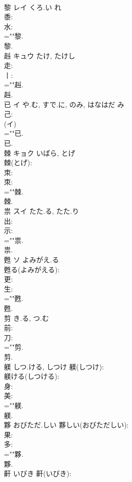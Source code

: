 \documentclass[8pt]{extreport}
\begin{document}
\begin{CJK}{UTF8}{min}
\\	黎	レイ	くろ.い	れ	
\\	黍: 
\\	水: 
\\	=""黎.
\\	黎.
\\	赳	キュウ		たけ, たけし	
\\	走: 
\\	丨: 
\\	=""赳.
\\	赳.
\\	已	イ	や.む, すで.に, のみ, はなはだ	み	
\\	己: 
\\	(イ)
\\	=""已.
\\	已.
\\	棘	キョク	いばら, とげ		
\\	棘(とげ): 
\\	朿: 
\\	朿: 
\\	=""棘.
\\	棘.
\\	祟	スイ	たた.る, たた.り		
\\	出: 
\\	示: 
\\	=""祟.
\\	祟.
\\	甦	ソ	よみがえ.る		
\\	甦る(よみがえる): 
\\	更: 
\\	生: 
\\	=""甦.
\\	甦.
\\	剪		き.る, つ.む				
\\	前: 
\\	刀: 
\\	=""剪.
\\	剪.
\\	躾		しつ.ける, しつけ			躾(しつけ): 
\\	躾ける(しつける): 
\\	身: 
\\	美: 
\\	=""躾.
\\	躾.
\\	夥		おびただ.しい			夥しい(おびただしい): 
\\	果: 
\\	多: 
\\	=""夥.
\\	夥.
\\	鼾		いびき			鼾(いびき): 

\end{CJK}
\end{document}
